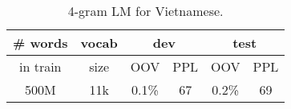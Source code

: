 \begin{table}[!ht]
\setlength{\tabcolsep}{0.9em}
\centering
\begin{tabular}{|c|c|c|c|c|c|} 
\hline
\# words & vocab & \multicolumn{2}{c|}{dev} & \multicolumn{2}{c|}{test}  \\ 
\hline
in train & size  & OOV   & PPL              & OOV   & PPL                \\ 
\hline
500M     & 11k   & 0.1\% & 67               & 0.2\% & 69                 \\
\hline
\end{tabular}
\caption{ 4-gram LM for Vietnamese.}
\label{table:LM_stats}
\end{table}
